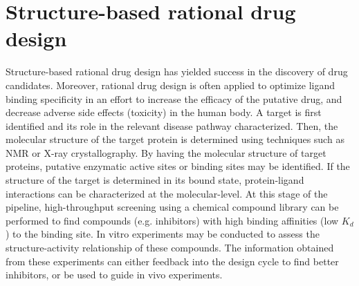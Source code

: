 \section{Structure-based rational drug design}
Structure-based rational drug design has yielded success in the discovery of drug candidates.\cite{Wlodawer:2002tt,Hubbard:2011fs}
Moreover, rational drug design is often applied to optimize ligand binding specificity in an effort to increase the efficacy of the putative drug, and decrease adverse side effects (toxicity) in the human body.
A target is first identified and its role in the relevant disease pathway characterized. Then, the molecular structure of the target protein is determined using techniques such as NMR or X-ray crystallography.  By having the molecular structure of target proteins, putative enzymatic active sites or binding sites may be identified.  If the structure of the target is determined in its bound state, protein-ligand interactions can be characterized at the molecular-level. At this stage of the pipeline, high-throughput screening using a chemical compound library can be performed to find compounds (e.g. inhibitors) with high binding affinities (low $K_d$) to the binding site. In vitro experiments may be conducted to assess the structure-activity relationship of these compounds.  The information obtained from these experiments can either feedback into the design cycle to find better inhibitors, or be used to guide in vivo experiments.


